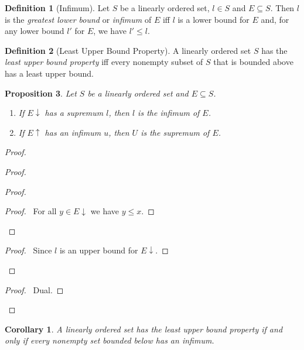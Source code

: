\documentclass{book}
\let\qed\relax
\newtheorem{prop}{Proposition}[chapter]
\newtheorem{cor}{Corollary}[prop]
\theoremstyle{definition}
\newtheorem{df}[prop]{Definition}
\begin{document}
\begin{df}[Infimum]
Let $S$ be a linearly ordered set, $l \in S$ and $E \subseteq S$. Then $l$ is the \emph{greatest lower bound} or \emph{infimum} of $E$ iff $l$ is a lower bound for $E$ and, for any lower bound $l'$ for $E$, we have $l' \leq l$.
\end{df}

\begin{df}[Least Upper Bound Property]
A linearly ordered set $S$ has the \emph{least upper bound property} iff every nonempty subset of $S$ that is bounded above has a least upper bound.
\end{df}

\begin{prop}
Let $S$ be a linearly ordered set and $E \subseteq S$.
\begin{enumerate}
\item If $E \downarrow$ has a supremum $l$, then $l$ is the infimum of $E$.
\item If $E \uparrow$ has an infimum $u$, then $U$ is the supremum of $E$.
\end{enumerate}
\end{prop}

\begin{proof}
\pf
{}
\begin{proof}
	\begin{proof}
		\begin{proof}
			\pf\ For all $y \in E \downarrow$ we have $y \leq x$.
		\end{proof}
	\end{proof}
	\begin{proof}
		\pf\ Since $l$ is an upper bound for $E \downarrow$.
	\end{proof}
\end{proof}
\begin{proof}
	\pf\ Dual.
\end{proof}
\qed
\end{proof}

\begin{cor}
A linearly ordered set has the least upper bound property if and only if every nonempty set bounded below has an infimum.
\end{cor}
\end{document}
